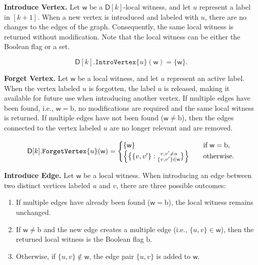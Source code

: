 \documentclass[11pt,a4paper]{article}
\newcommand{\treewidthvalue}{k}
\newcommand{\forgetvertextype}[1]{\mathtt{ForgetVertex}\{#1\}}
\newcommand{\introvertexgeneric}[1]{\mathtt{IntroVertex}\{#1\}}
\newcommand{\vertexone}{u}
\newcommand{\vertextwo}{v}
\newcommand{\awitness}{\mathsf{w}}
\newcommand{\dpcore}{\mathsf{D}}
\newcommand{\multiedgefound}{\mathrm{b}}
\begin{document}
{	\noindent\textbf{Introduce Vertex.}
	Let \(\awitness\) be a \(\dpcore[\treewidthvalue]\)-local witness, and let \(\vertexone\) represent a label in \([\treewidthvalue + 1]\). When a new vertex is introduced and labeled with \(\vertexone\), there are no changes to the edges of the graph. Consequently, the same local witness is returned without modification. Note that the local witness can be either the Boolean flag or a set.

	\[
	\dpcore[\treewidthvalue].\introvertexgeneric{\vertexone}(\awitness) = \{\awitness\}.
	\]

	\noindent\textbf{Forget Vertex.}
	Let \(\awitness\) be a local witness, and let \(\vertexone\) represent an active label. When the vertex labeled \(\vertexone\) is forgotten, the label \(\vertexone\) is released, making it available for future use when introducing another vertex. If multiple edges have been found, i.e., \(\awitness = \multiedgefound\), no modifications are required and the same local witness is returned. If multiple edges have not been found (\(\awitness\neq \multiedgefound\)), then the edges connected to the vertex labeled \(\vertexone\) are no longer relevant and are removed.

		\[
		\dpcore[\treewidthvalue].\forgetvertextype{\vertexone}(\awitness) =
		\begin{cases}
			\{\awitness\} & \quad \text{if } \awitness = \multiedgefound, \\
			\Bigl\{\bigl\{\{\vertextwo, \vertextwo'\} : \substack{\vertextwo,\vertextwo'\neq \vertexone\\ \{\vertextwo, \vertextwo'\}\in \awitness}\bigr\}\Bigr\} & \quad \text{otherwise.}
		\end{cases}
		\]

	\noindent\textbf{Introduce Edge.}
	Let \(\awitness\) be a local witness. When introducing an edge between two distinct vertices labeled \(\vertexone\) and \(\vertextwo\), there are three possible outcomes:
	\begin{enumerate}
	    \item If multiple edges have already been found (\(\awitness = \multiedgefound\)), the local witness remains unchanged.
	    \item If \(\awitness \neq \multiedgefound\) and the new edge creates a multiple edge (i.e., \(\{\vertexone, \vertextwo\} \in \awitness\)), then the returned local witness is the Boolean flag \(\multiedgefound\).
	    \item Otherwise, if \(\{\vertexone, \vertextwo\} \notin \awitness\), the edge pair \(\{\vertexone, \vertextwo\}\) is added to \(\awitness\).
	\end{enumerate}

}
\end{document}
